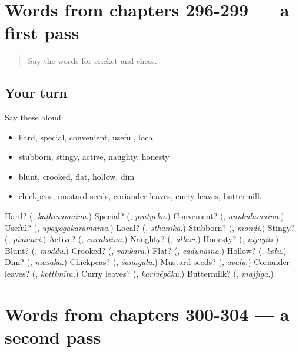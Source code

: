 \section[(dialogue)]{Words from chapters 296-299 — a first pass}

\label{lesson:TE-R304-first-pass-words-from-chapters-296-299}



\begin{quote}
Say the words for cricket and chess.
\end{quote}

\subsection*{Your turn}
Say these aloud:

\begin{itemize}
\raggedright
  \item hard, special, convenient, useful, local
  \item stubborn, stingy, active, naughty, honesty
  \item blunt, crooked, flat, hollow, dim
  \item chickpeas, mustard seeds, coriander leaves, curry leaves, buttermilk
\end{itemize}

\begin{tcolorbox}[breakable,colback=teal!4,colframe=teal!35!black,title={Before you move on}]
Hard? (\textbf{}, \emph{kaṭhinamaina}.) Special? (\textbf{}, \emph{pratyēka}.) Convenient? (\textbf{}, \emph{anukūlamaina}.) Useful? (\textbf{}, \emph{upayōgakaramaina}.) Local? (\textbf{}, \emph{sthānika}.) Stubborn? (\textbf{}, \emph{moṇḍi}.) Stingy? (\textbf{}, \emph{pisināri}.) Active? (\textbf{}, \emph{curukaina}.) Naughty? (\textbf{}, \emph{allari}.) Honesty? (\textbf{}, \emph{nijāyitī}.) Blunt? (\textbf{}, \emph{moddu}.) Crooked? (\textbf{}, \emph{vaṅkara}.) Flat? (\textbf{}, \emph{cadunaina}.) Hollow? (\textbf{}, \emph{bōlu}.) Dim? (\textbf{}, \emph{masaka}.) Chickpeas? (\textbf{}, \emph{śanagalu}.) Mustard seeds? (\textbf{}, \emph{āvālu}.) Coriander leaves? (\textbf{}, \emph{kottimīra}.) Curry leaves? (\textbf{}, \emph{karivēpāku}.) Buttermilk? (\textbf{}, \emph{majjiga}.)
\end{tcolorbox}
\section[(dialogue)]{Words from chapters 300-304 — a second pass}

